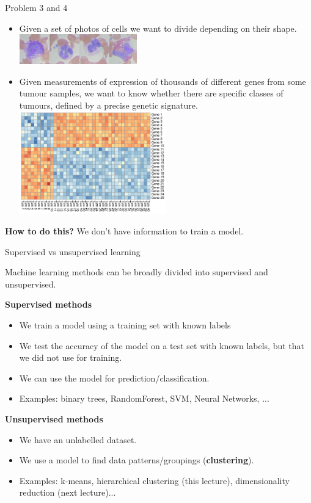 \documentclass[9pt]{beamer}
\begin{document}
\begin{frame}
{Problem 3 and 4}

\begin{itemize}
\item Given a set of photos of cells we want to divide depending on their shape.\\
\centering \includegraphics[width=0.4\textwidth]{celltypes.png}\\
\pause

\item Given measurements of expression of thousands of different genes from some tumour samples, we want to know whether there are specific classes of tumours, defined by a precise genetic signature.
\centering \includegraphics[width=0.5\textwidth]{heatmap.png}
\end{itemize}
\pause
\begin{center}
\textbf{How to do this?} We don't have information to train a model.
\end{center}
\end{frame}

\begin{frame}
{Supervised vs unsupervised learning}

Machine learning methods can be broadly divided into supervised and unsupervised.

\textbf{Supervised methods}
\begin{itemize}
\item We train a model using a training set with known labels
\item We test the accuracy of the model on a test set with known labels, but that we did not use for training.
\item We can use the model for prediction/classification.
\item Examples: binary trees, RandomForest, SVM, Neural Networks, ...
\end{itemize}
\pause
\textbf{Unsupervised methods}
\begin{itemize}
\item We have an unlabelled dataset. 
\item We use a model to find data patterns/groupings (\textbf{clustering}).
\item Examples: k-means, hierarchical clustering (this lecture), dimensionality reduction (next lecture)...
\end{itemize}
\end{frame}
\end{document}
